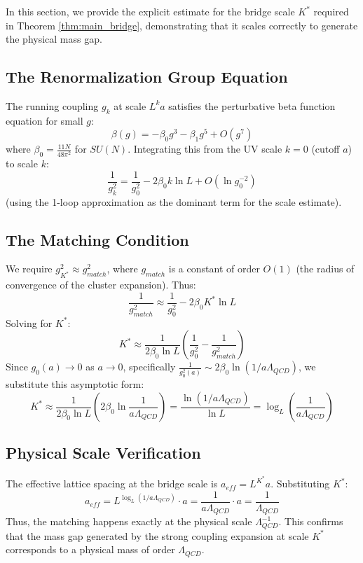 In this section, we provide the explicit estimate for the bridge scale $K^*$ required in Theorem \ref{thm:main_bridge}, demonstrating that it scales correctly to generate the physical mass gap.

\subsection{The Renormalization Group Equation}

The running coupling $g_k$ at scale $L^k a$ satisfies the perturbative beta function equation for small $g$:
\[
\beta(g) = - \beta_0 g^3 - \beta_1 g^5 + O(g^7)
\]
where $\beta_0 = \frac{11N}{48\pi^2}$ for $SU(N)$.
Integrating this from the UV scale $k=0$ (cutoff $a$) to scale $k$:
\[
\frac{1}{g_k^2} = \frac{1}{g_0^2} - 2\beta_0 k \ln L + O( \ln g_0^{-2} )
\]
(using the 1-loop approximation as the dominant term for the scale estimate).

\subsection{The Matching Condition}

We require $g_{K^*}^2 \approx g_{match}^2$, where $g_{match}$ is a constant of order $O(1)$ (the radius of convergence of the cluster expansion).
Thus:
\[
\frac{1}{g_{match}^2} \approx \frac{1}{g_0^2} - 2\beta_0 K^* \ln L
\]
Solving for $K^*$:
\[
K^* \approx \frac{1}{2\beta_0 \ln L} \left( \frac{1}{g_0^2} - \frac{1}{g_{match}^2} \right)
\]
Since $g_0(a) \to 0$ as $a \to 0$, specifically $\frac{1}{g_0^2(a)} \sim 2\beta_0 \ln(1/a\Lambda_{QCD})$, we substitute this asymptotic form:
\[
K^* \approx \frac{1}{2\beta_0 \ln L} \left( 2\beta_0 \ln \frac{1}{a\Lambda_{QCD}} \right) = \frac{\ln(1/a\Lambda_{QCD})}{\ln L} = \log_L \left( \frac{1}{a\Lambda_{QCD}} \right)
\]

\subsection{Physical Scale Verification}

The effective lattice spacing at the bridge scale is $a_{eff} = L^{K^*} a$.
Substituting $K^*$:
\[
a_{eff} = L^{\log_L(1/a\Lambda_{QCD})} \cdot a = \frac{1}{a\Lambda_{QCD}} \cdot a = \frac{1}{\Lambda_{QCD}}
\]
Thus, the matching happens exactly at the physical scale $\Lambda_{QCD}^{-1}$. This confirms that the mass gap generated by the strong coupling expansion at scale $K^*$ corresponds to a physical mass of order $\Lambda_{QCD}$.

